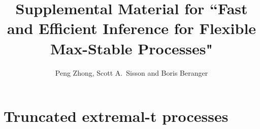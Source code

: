 \documentclass[lineno]{biometrika}
\begin{document}
\title{Supplemental Material for ``Fast and Efficient Inference for Flexible Max-Stable Processes"}
\author{Peng Zhong, Scott A.~Sisson and Boris Beranger}



\maketitle

\appendix
\section{Truncated extremal-t processes}
\label{sec:appendix_truncated_extremal_t}
\end{document}
